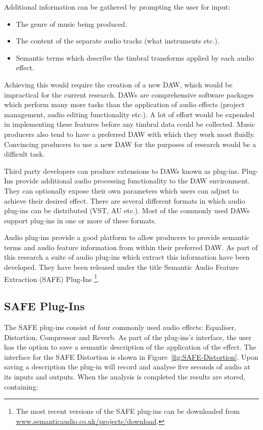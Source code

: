 		Additional information can be gathered by prompting the user for input:

		\begin{itemize}
			\item The genre of music being produced.
			\item The content of the separate audio tracks (what instruments etc.).
			\item Semantic terms which describe the timbral transforms applied by each audio
			      effect.
		\end{itemize}

		Achieving this would require the creation of a new DAW, which would be impractical for the current
		research. DAWs are comprehensive software packages which perform many more tasks than the application of
		audio effects (project management, audio editing functionality etc.). A lot of effort would be expended in
		implementing these features before any timbral data could be collected. Music producers also tend to have a
		preferred DAW with which they work most fluidly. Convincing producers to use a new DAW for the purposes of
		research would be a difficult task.

		Third party developers can produce extensions to DAWs known as plug-ins. Plug-Ins provide additional audio
		processing functionality to the DAW environment. They can optionally expose their own parameters which
		users can adjust to achieve their desired effect. There are several different formats in which audio
		plug-ins can be distributed (VST, AU etc.). Most of the commonly used DAWs support plug-ins in one or more
		of these formats.

		Audio plug-ins provide a good platform to allow producers to provide semantic terms and audio feature
		information from within their preferred DAW. As part of this research a suite of audio plug-ins which
		extract this information have been developed. They have been released under the title Semantic Audio
		Feature Extraction (SAFE) Plug-Ins \footnote{The most recent versions of the SAFE plug-ins can be
		downloaded from \href{http://www.semanticaudio.co.uk/projects/download/}
		{www.semanticaudio.co.uk/projects/download}.}.

	\subsection{SAFE Plug-Ins}
	\label{sec:TimbreEvaluation-DAWBasedTimbreEvaluation-SAFE}
		The SAFE plug-ins consist of four commonly used audio effects: Equaliser, Distortion, Compressor and
		Reverb. As part of the plug-ins's interface, the user has the option to save a semantic description of the
		application of the effect. The interface for the SAFE Distortion is shown in
		Figure~\ref{fig:SAFE-Distortion}. Upon saving a description the plug-in will record and analyse five
		seconds of audio at its inputs and outputs. When the analysis is completed the results are stored,
		containing:

